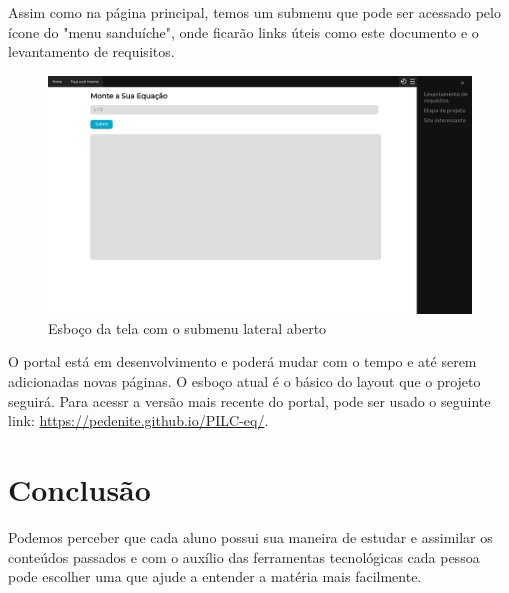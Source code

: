\documentclass[12pt]{report}
\begin{document}
Assim como na página principal, temos um submenu que pode ser acessado pelo ícone do "menu sanduíche", onde ficarão links úteis como este documento e o levantamento de requisitos.

\begin{figure}[H]
    \includegraphics[width=1\textwidth]{img/submenu.png}
    \caption{Esboço da tela com o submenu lateral aberto}
\end{figure}

O portal está em desenvolvimento e poderá mudar com o tempo e até serem adicionadas novas páginas. O esboço atual é o básico do layout que o projeto seguirá. Para acessr a versão mais recente do portal, pode ser usado o seguinte link: \url{https://pedenite.github.io/PILC-eq/}.

\chapter{Conclusão}
Podemos perceber que cada aluno possui sua maneira de estudar e assimilar os conteúdos passados e com o auxílio das ferramentas tecnológicas cada pessoa pode escolher uma que ajude a entender a matéria mais facilmente.
\end{document}
